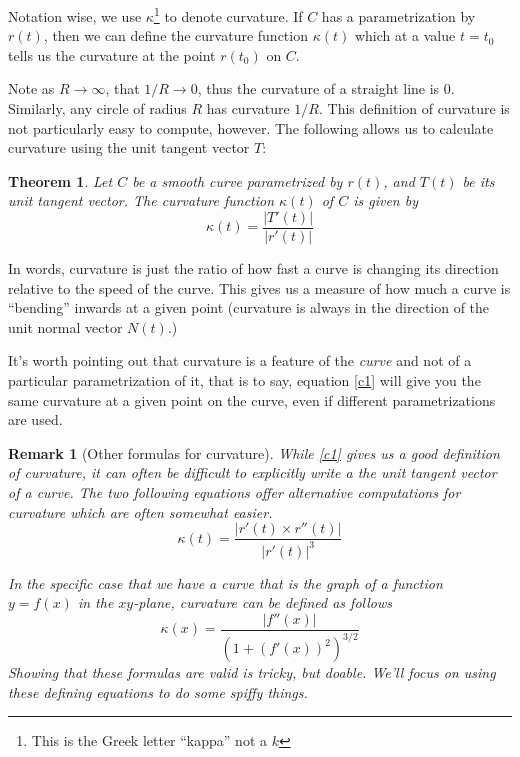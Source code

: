 \documentclass[12pt]{article}
\numberwithin{equation}{subsection}
\numberwithin{figure}{subsection}
\newtheorem{thm}[subsection]{Theorem}
\theoremstyle{note}
\newtheorem{remark}[subsection]{Remark}
\begin{document}
{Notation wise, we use $\kappa$\footnote{This is the Greek letter ``kappa'' not a $k$} to denote curvature. If $C$ has a parametrization by $r(t)$, then we can define the curvature function $\kappa(t)$ which at a value $t=t_0$ tells us the curvature at the point $r(t_0)$ on $C$. 

Note as $R\to \infty$, that $1/R\to 0$, thus the curvature of a straight line is 0. Similarly, any circle of radius $R$ has curvature $1/R$. This definition of curvature is not particularly easy to compute, however. The following allows us to calculate curvature using the unit tangent vector $T$: 

\begin{thm} Let $C$ be a smooth curve parametrized by $r(t)$, and $T(t)$ be its unit tangent vector.  The curvature function $\kappa(t)$ of $C$ is given by \begin{equation} \label{c1}
	\kappa(t) = \dfrac{|T'(t)|}{|r'(t)|}
\end{equation}
\end{thm}

In words, curvature is just the ratio of how fast a curve is changing its direction relative to the speed of the curve. This gives us a measure of how much a curve is ``bending'' inwards at a given point (curvature is always in the direction of the unit normal vector $N(t)$.) 

It's worth pointing out that curvature is a feature of the \textit{curve} and not of a particular parametrization of it, that is to say, equation \eqref{c1} will give you the same curvature at a given point on the curve, even if different parametrizations are used. 

\begin{remark}[Other formulas for curvature]While \eqref{c1} gives us a good definition of curvature, it can often be difficult to explicitly write a the unit tangent vector of a curve. The two following equations offer alternative computations for curvature which are often somewhat easier. \begin{equation} \label{c2}
	\kappa(t)= \dfrac{ |r'(t) \times r''(t)| }{|r'(t)|^3} \end{equation}

In the specific case that we have a curve that is the graph of a function $y=f(x)$ in the $xy$-plane, curvature can be defined as follows \begin{equation} \label{c3}
	\kappa(x)=\dfrac{|f''(x)|}{\left(1+(f'(x))^2\right)^{3/2}} \end{equation} 
Showing that these formulas are valid is tricky, but doable. We'll focus on using these defining equations to do some spiffy things. \end{remark}

}
\end{document}
